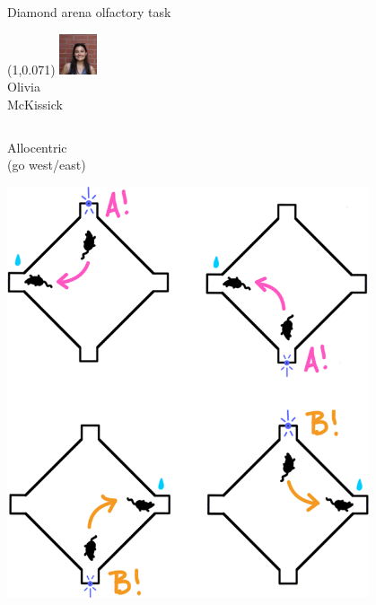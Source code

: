 \documentclass[bigger]{beamer}
\begin{document}
\begin{frame}[label={sec:orge128abd}]{Diamond arena olfactory task}
\begin{textblock}{0.2}(1,0.071)%
\center%
\includegraphics[width=3em]{img/olivia.jpg}\\
\scriptsize
Olivia\\McKissick
\end{textblock}
\begin{columns}
\begin{column}[t]{0.5\columnwidth}
\center
Allocentric\\
(go west/east)
\begin{center}
\includegraphics[width=0.8\textwidth]{img/allocentric-task.png}
\end{center}
\end{column}


\end{columns}
\end{frame}
\end{document}
